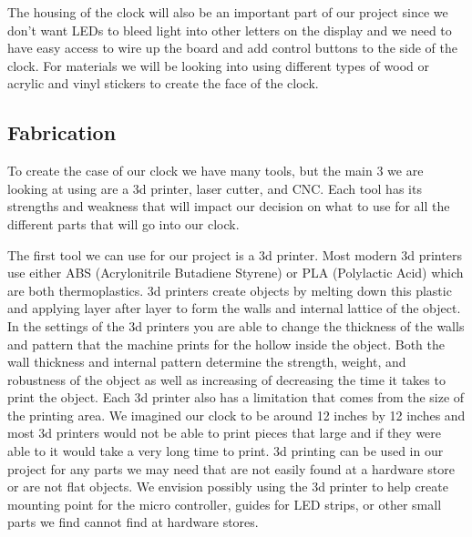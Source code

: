 \documentclass[10pt,draftclsnofoot,onecolumn]{IEEEtran}
\begin{document}
The housing of the clock will also be an important part of our project since we don’t want LEDs to bleed light into other letters on the display and we need to have easy access to wire up the board and add control buttons to the side of the clock. For materials we will be looking into using different types of wood or acrylic and vinyl stickers to create the face of the clock.

\subsection{Fabrication}
To create the case of our clock we have many tools, but the main 3 we are looking at using are a 3d printer, laser cutter, and CNC. Each tool has its strengths and weakness that will impact our decision on what to use for all the different parts that will go into our clock. 

The first tool we can use for our project is a 3d printer. Most modern 3d printers use either ABS (Acrylonitrile Butadiene Styrene) or PLA (Polylactic Acid) which are both thermoplastics. 3d printers create objects by melting down this plastic and applying layer after layer to form the walls and internal lattice of the object. In the settings of the 3d printers you are able to change the thickness of the walls and pattern that the machine prints for the hollow inside the object. Both the wall thickness and internal pattern determine the strength, weight, and robustness of the object as well as increasing of decreasing the time it takes to print the object. Each 3d printer also has a limitation that comes from the size of the printing area. We imagined our clock to be around 12 inches by 12 inches and most 3d printers would not be able to print pieces that large and if they were able to it would take a very long time to print. 3d printing can be used in our project for any parts we may need that are not easily found at a hardware store or are not flat objects. We envision possibly using the 3d printer to help create mounting point for the micro controller, guides for LED strips, or other small parts we find cannot find at hardware stores. 
\end{document}
